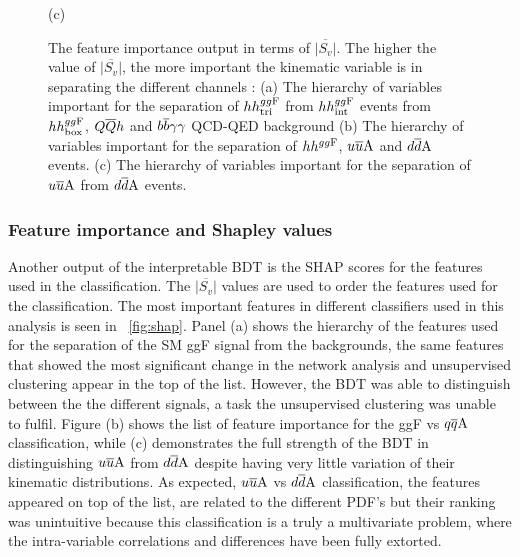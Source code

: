 \begin{figure}[t!]
		{  \footnotesize  (c)}
	\caption{The feature importance output in terms of $\overline{|S_v|}$. The higher the value of $\overline{|S_v|}$, the more important the kinematic variable is in separating the different channels : (a) The hierarchy of variables important for the separation of $hh^{gg\rm F}_{\rm tri}$ from $hh^{gg\rm F}_{\rm int}$ events from $hh^{gg\rm F}_{\rm box}$, $Q\overline Q h$ and $b\overline b\gamma\gamma$ QCD-QED background  (b) The hierarchy of variables important for the separation of $hh^{gg\rm F}$, $u\overline u \rm A$ and $d\overline d \rm A$ events. (c) The hierarchy of variables important for the separation of $u\overline u \rm A$ from $d\overline d \rm A$ events.}
	\label{fig:shap}
\end{figure}
\FloatBarrier
\subsubsection*{Feature importance and Shapley values}
Another output of the interpretable BDT is the SHAP scores for the features used in the classification.  The $\overline{|S_v|}$ values are used to order the features used for the classification. The most important features in different classifiers used in this analysis is seen in ~\autoref{fig:shap}. Panel (a) shows the hierarchy of the features used for the separation of the SM ggF signal from the backgrounds, the same features that showed the most significant change in the network analysis and unsupervised clustering appear in the top of the list. However, the BDT was able to  distinguish between the the different signals, a task the unsupervised clustering was unable to fulfil. Figure (b) shows the list of feature importance for the ggF vs $q\overline q \rm A$ classification, while (c) demonstrates the full strength of the BDT in distinguishing $u\overline u \rm A$ from $d\overline d \rm A$ despite having very little variation of their kinematic distributions.  As expected, $u\overline u \rm A$ vs $d\overline d \rm A$ classification, the features appeared on top of the list, are related to the different PDF's but their ranking was unintuitive because this classification is a truly a multivariate problem, where the intra-variable correlations and differences have been fully extorted. 
